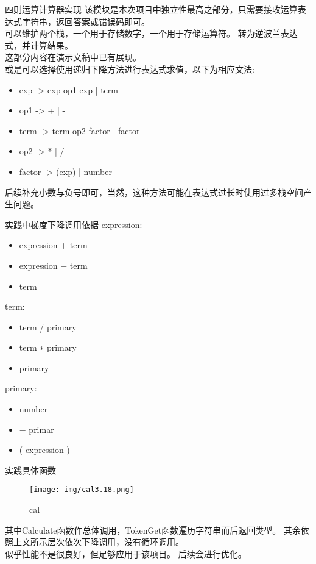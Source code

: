 \documentclass[10pt]{beamer}
\begin{document}
\begin{frame}{四则运算计算器实现}
    该模块是本次项目中独立性最高之部分，只需要接收运算表达式字符串，返回答案或错误码即可。\\
    可以维护两个栈，一个用于存储数字，一个用于存储运算符。
    转为逆波兰表达式，并计算结果。\\
    这部分内容在演示文稿中已有展现。\\
    或是可以选择使用递归下降方法进行表达式求值，以下为相应文法:\\
    \begin{itemize}
        \item exp -> exp op1 exp | term
        \item op1 -> + | -
        \item term -> term op2 factor | factor
        \item op2 -> * | /
        \item factor -> (exp) | number
    \end{itemize}
    后续补充小数与负号即可，当然，这种方法可能在表达式过长时使用过多栈空间产生问题。\\
\end{frame}

\begin{frame}{实践中梯度下降调用依据}
    expression:
    \begin{itemize}
        \item expression + term
        \item expression − term
        \item term
    \end{itemize}

    term:
    \begin{itemize}
        \item term / primary
        \item term ∗ primary
        \item primary
    \end{itemize}
        
    primary:   
    \begin {itemize}
        \item number
        \item − primar
        \item ( expression )
    \end{itemize}
\end{frame}

\begin{frame}{实践具体函数}
    \begin{figure}[H]
        \centering
        \texttt{[image: img/cal3.18.png]}
        \caption{cal}
        \label{cal3.18}
    \end{figure}
    其中Calculate函数作总体调用，TokenGet函数遍历字符串而后返回类型。
    其余依照上文所示层次依次下降调用，没有循环调用。\\
    似乎性能不是很良好，但足够应用于该项目。
    后续会进行优化。\\
\end{frame}
\end{document}
